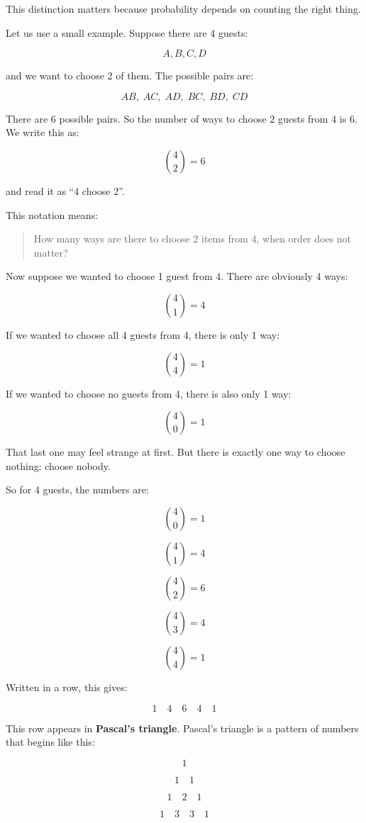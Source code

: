 \documentclass[
  letterpaper,
  DIV=11,
  numbers=noendperiod]{scrreprt}
\begin{document}
This distinction matters because probability depends on counting the
right thing.

Let us use a small example. Suppose there are 4 guests:

\[
A,B,C,D
\]

and we want to choose 2 of them. The possible pairs are:

\[
AB,\; AC,\; AD,\; BC,\; BD,\; CD
\]

There are 6 possible pairs. So the number of ways to choose 2 guests
from 4 is 6. We write this as:

\[
\binom{4}{2}=6
\]

and read it as ``4 choose 2''.

This notation means:

\begin{quote}
How many ways are there to choose 2 items from 4, when order does not
matter?
\end{quote}

Now suppose we wanted to choose 1 guest from 4. There are obviously 4
ways:

\[
\binom{4}{1}=4
\]

If we wanted to choose all 4 guests from 4, there is only 1 way:

\[
\binom{4}{4}=1
\]

If we wanted to choose no guests from 4, there is also only 1 way:

\[
\binom{4}{0}=1
\]

That last one may feel strange at first. But there is exactly one way to
choose nothing: choose nobody.

So for 4 guests, the numbers are:

\[
\binom{4}{0}=1
\]

\[
\binom{4}{1}=4
\]

\[
\binom{4}{2}=6
\]

\[
\binom{4}{3}=4
\]

\[
\binom{4}{4}=1
\]

Written in a row, this gives:

\[
1 \quad 4 \quad 6 \quad 4 \quad 1
\]

This row appears in \textbf{Pascal's triangle}. Pascal's triangle is a
pattern of numbers that begins like this:

\[
1
\]

\[
1 \quad 1
\]

\[
1 \quad 2 \quad 1
\]

\[
1 \quad 3 \quad 3 \quad 1
\]
\end{document}
